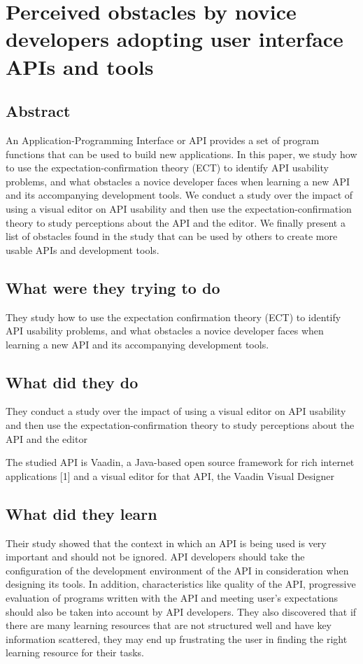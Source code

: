 \section{Perceived obstacles by novice developers adopting user interface APIs and tools}

\subsection{Abstract}

An Application-Programming Interface or API provides a set of program functions that can be used to build new applications. In this paper, we study how to use the expectation-confirmation theory (ECT) to identify API usability problems, and what obstacles a novice developer faces when learning a new API and its accompanying development tools. We conduct a study over the impact of using a visual editor on API usability and then use the expectation-confirmation theory to study perceptions about the API and the editor. We finally present a list of obstacles found in the study that can be used by others to create more usable APIs and development tools.

\subsection{What were they trying to do}

They study how to use the expectation confirmation theory (ECT) to identify API usability problems, and what obstacles a novice developer faces when learning a new API and its accompanying development tools.

\subsection{What did they do}

They conduct a study over the impact of using a visual editor on API usability and then use the expectation-confirmation theory to study perceptions about the API and the editor

The studied API is Vaadin, a Java-based open source framework for rich internet applications [1] and a visual editor for that API, the Vaadin Visual Designer

\subsection{What did they learn}

Their study showed that the context in which an API is being used is very important and should not be ignored. API developers should take the configuration of the development environment of the API in consideration when designing its tools. In addition, characteristics like quality of the API, progressive evaluation of programs written with the API and meeting user’s expectations should also be taken into account by API developers. They also discovered that if there are many learning resources that are not structured well and have key information scattered, they may end up frustrating the user in finding the right learning resource for their tasks.
